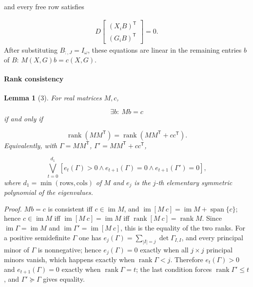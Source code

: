 \documentclass[journal]{IEEEtran}
\theoremstyle{plainn}
\newtheorem*{lem}{Lemma}
\begin{document}
and every free row satisfies

\begin{equation}
\begin{gathered}
D\begin{bmatrix}(X_iB)^{\mathsf T}\\ (G_iB)^{\mathsf T}\end{bmatrix}=0.
\end{gathered}
\end{equation}
After substituting $B_{:,J}=I_\omega$, these equations are linear in the remaining entries $b$ of $B$: $M(X,G)b=c(X,G)$.

\paragraph*{Rank consistency}\label{sec:rankcons}
\begin{lem}[3] For real matrices $M,c$,

\begin{equation}
\exists b:\ Mb=c
\end{equation}
if and only if

\begin{equation}
\operatorname{rank}(MM^{\mathsf T})
=\operatorname{rank}(MM^{\mathsf T}+cc^{\mathsf T}).
\end{equation}
Equivalently, with $\Gamma=MM^{\mathsf T}$, $\Gamma'=MM^{\mathsf T}+cc^{\mathsf T}$,

\begin{equation}
\bigvee_{t=0}^{d_1}
\left[e_t(\Gamma)>0\wedge e_{t+1}(\Gamma)=0\wedge e_{t+1}(\Gamma')=0\right],
\end{equation}
where $d_1=\min(\text{rows},\text{cols})$ of $M$ and $e_j$ is the $j$-th elementary symmetric polynomial of the eigenvalues.

\end{lem}
\emph{Proof.} $Mb=c$ is consistent iff $c\in\operatorname{im}M$, and
$\operatorname{im}[M\ c]=\operatorname{im}M+\operatorname{span}\{c\}$; hence
$c\in\operatorname{im}M$ iff $\operatorname{im}[M\ c]=\operatorname{im}M$ iff
$\operatorname{rank}[M\ c]=\operatorname{rank}M$. Since $\operatorname{im}\Gamma=\operatorname{im}M$ and
$\operatorname{im}\Gamma'=\operatorname{im}[M\ c]$, this is the equality of the two ranks. For a positive semidefinite $\Gamma$ one has $e_j(\Gamma)=\sum_{|I|=j}\det\Gamma_{I,I}$, and every principal minor of $\Gamma$ is nonnegative; hence $e_j(\Gamma)=0$ exactly when all $j\times j$ principal minors vanish, which happens exactly when $\operatorname{rank}\Gamma<j$. Therefore $e_t(\Gamma)>0$ and $e_{t+1}(\Gamma)=0$ exactly when $\operatorname{rank}\Gamma=t$; the last condition forces $\operatorname{rank}\Gamma'\le t$, and $\Gamma'\succeq\Gamma$ gives equality.
\end{document}
